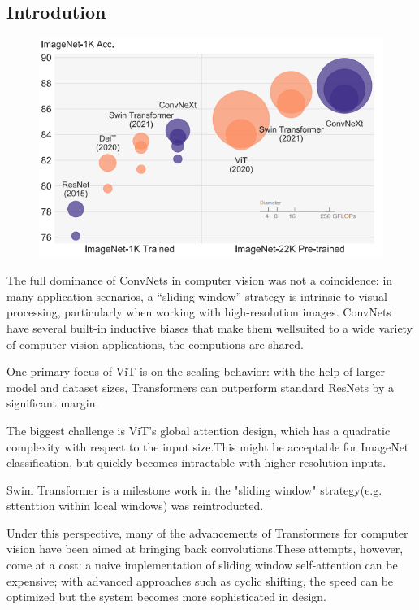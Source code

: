 \documentclass[11pt]{article}
\begin{document}
\subsection{Introdution}
\begin{figure}[H]
	\centering
	\includegraphics[scale=0.5]{41}
\end{figure}

The full dominance of ConvNets in computer vision was not a coincidence: in many application scenarios, a “sliding window” strategy is intrinsic to visual processing, particularly when working with high-resolution images. ConvNets have several built-in inductive biases that make them wellsuited to a wide variety of computer vision applications, the computions are shared.

One primary focus of ViT is on the scaling behavior: with the help of larger model and dataset sizes, Transformers can outperform standard ResNets by a significant margin.

The biggest challenge is ViT’s global attention design, which has a quadratic complexity with respect to the input size.This might be acceptable for ImageNet classification, but quickly becomes intractable with higher-resolution inputs.

Swim Transformer is a milestone work in the "sliding window" strategy(e.g. sttenttion within local windows) was reintroducted.

Under this perspective, many of the advancements of Transformers for computer vision have been aimed at bringing back convolutions.These attempts, however, come at a cost: a naive implementation of sliding window self-attention can be expensive; with advanced approaches such as cyclic shifting, the speed can be optimized but the system becomes more sophisticated in design.
\end{document}
